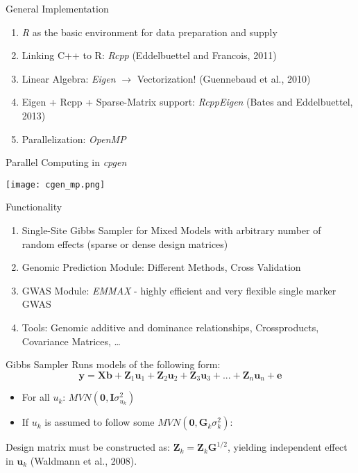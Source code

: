 \documentclass[xcolor=dvipsnames,aspectratio=169]{beamer}
\begin{document}
\begin{frame}{General Implementation}
\pause
\begin{enumerate}
\item \textit{R} as the basic environment for data preparation and supply
\item Linking C++ to R: \textit{Rcpp} (Eddelbuettel and Francois, 2011)
\item Linear Algebra: \textit{Eigen} $\rightarrow$ Vectorization! (Guennebaud et al., 2010)
\item Eigen + Rcpp + Sparse-Matrix support: \textit{RcppEigen} (Bates and Eddelbuettel, 2013)
\item Parallelization: \textit{OpenMP}
\end{enumerate}
\end{frame}

\begin{frame}{Parallel Computing in \textit{cpgen}}
\pause
\begin{center}
\tiny
\texttt{[image: cgen\_mp.png]}
\end{center}
\end{frame}

\begin{frame}{Functionality}
\pause
\begin{enumerate}
\item Single-Site Gibbs Sampler for Mixed Models with arbitrary number of random effects (sparse or dense design matrices)
\item Genomic Prediction Module: Different Methods, Cross Validation
\item GWAS Module: \textit{EMMAX} - highly efficient and very flexible single marker GWAS
\item Tools: Genomic additive and dominance relationships, Crossproducts, Covariance Matrices, \dots
\end{enumerate}
\end{frame}


\begin{frame}{Gibbs Sampler}
Runs models of the following form:
\begin{equation*}
\mathbf{y} = \mathbf{Xb} + \mathbf{Z}_{1}\mathbf{u}_1 + \mathbf{Z}_{2}\mathbf{u}_2 + \mathbf{Z}_{3}\mathbf{u}_3 + ... + \mathbf{Z}_{n}\mathbf{u}_n + \mathbf{e}
\end{equation*}
\begin{itemize}
\item For all $u_k$: $MVN(\mathbf{0},\mathbf{I}\sigma^2_{u_k})$
\item If $u_k$ is assumed to follow some $MVN(\mathbf{0},\mathbf{G}_k\sigma_{k}^2)$:
\end{itemize}
 Design matrix must be constructed as: $ \mathbf{Z}_k = \mathbf{Z}_k \mathbf{G}^{1/2}$, yielding independent effect in $\mathbf{u}_k$ (Waldmann et al., 2008). 
\end{frame}
\end{document}
